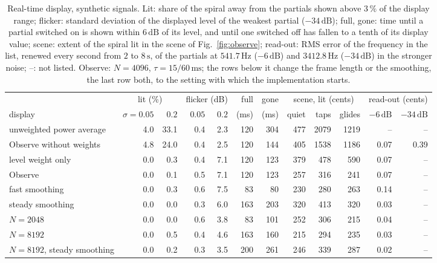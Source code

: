\documentclass[10pt,a4paper,twocolumn]{article}
\newcommand{\Hz}{\,\mathrm{Hz}}
\newcommand{\dB}{\,\mathrm{dB}}
\newcommand{\s}{\,\mathrm{s}}
\newcommand{\ms}{\,\mathrm{ms}}
\begin{document}
\begin{table}[t]
\centering
\caption{Real-time display, synthetic signals. Lit: share of the spiral away from the partials shown above $3\,\%$ of the display range; flicker: standard deviation of the displayed level of the weakest partial ($-34\dB$); full, gone: time until a partial switched on is shown within $6\dB$ of its level, and until one switched off has fallen to a tenth of its display value; scene: extent of the spiral lit in the scene of Fig.~\ref{fig:observe}; read-out: RMS error of the frequency in the list, renewed every second from $2$ to $8\s$, of the partials at $541.7\Hz$ ($-6\dB$) and $3412.8\Hz$ ($-34\dB$) in the stronger noise; --: not listed. Observe: $N = 4096$, $\tau = 15/60\ms$; the rows below it change the frame length or the smoothing, the last row both, to the setting with which the implementation starts.}
\label{tab:observe}
\small
\begin{tabular}{@{}lrrrrrrrrrrr@{}}
\toprule
 & \multicolumn{2}{c}{lit (\%)} & \multicolumn{2}{c}{flicker (dB)} & full & gone & \multicolumn{3}{c}{scene, lit (cents)} & \multicolumn{2}{c}{read-out (cents)}\\
\cmidrule(lr){2-3}\cmidrule(lr){4-5}\cmidrule(lr){8-10}\cmidrule(l){11-12}
display & $\sigma{=}0.05$ & $0.2$ & $0.05$ & $0.2$ & (ms) & (ms) & quiet & taps & glides & $-6\dB$ & $-34\dB$\\
\midrule
unweighted power average & 4.0 & 33.1 & 0.4 & 2.3 & 120 & 304 & 477 & 2079 & 1219 & -- & -- \\
Observe without weights & 4.8 & 24.0 & 0.4 & 2.5 & 120 & 144 & 405 & 1538 & 1186 & 0.07 & 0.39 \\
\quad level weight only & 0.0 & 0.3 & 0.4 & 7.1 & 120 & 123 & 379 & 478 & 590 & 0.07 & -- \\
Observe & 0.0 & 0.1 & 0.5 & 7.1 & 120 & 123 & 257 & 316 & 241 & 0.07 & -- \\
\quad fast smoothing & 0.0 & 0.3 & 0.6 & 7.5 & 83 & 80 & 230 & 280 & 263 & 0.14 & -- \\
\quad steady smoothing & 0.0 & 0.0 & 0.3 & 6.0 & 163 & 203 & 320 & 413 & 320 & 0.03 & -- \\
\quad $N = 2048$ & 0.0 & 0.0 & 0.6 & 3.8 & 83 & 101 & 252 & 306 & 215 & 0.04 & -- \\
\quad $N = 8192$ & 0.0 & 0.5 & 0.4 & 4.6 & 163 & 160 & 215 & 294 & 235 & 0.03 & -- \\
\quad $N = 8192$, steady smoothing & 0.0 & 0.2 & 0.3 & 3.5 & 200 & 261 & 246 & 339 & 287 & 0.02 & -- \\
\bottomrule
\end{tabular}
\end{table}
\end{document}
